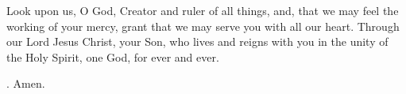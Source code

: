 \lettrine[lines=3]{L}{}ook upon us, O God,
Creator and ruler of all things,
and, that we may feel the working of your mercy,
grant that we may serve you with all our heart.
Through our Lord Jesus Christ, your Son,
who lives and reigns with you in the unity of the Holy Spirit,
one God, for ever and ever. \par \Rbar. Amen.
